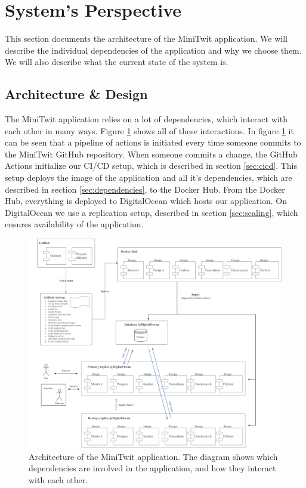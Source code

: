 \section{System's Perspective} \label{sec:system}
This section documents the architecture of the MiniTwit application. We will describe the individual dependencies of the application and why we choose them. We will also describe what the current state of the system is.

\subsection{Architecture \& Design}
The MiniTwit application relies on a lot of dependencies, which interact with each other in many ways. Figure \ref{fig:architecture} shows all of these interactions. In figure \ref{fig:architecture} it can be seen that a pipeline of actions is initiated every time someone commits to the MiniTwit GitHub repository. When someone commits a change, the GitHub Actions initialize our CI/CD setup, which is described in section \ref{sec:cicd}. This setup deploys the image of the application and all it's dependencies, which are described in section \ref{sec:dependencies}, to the Docker Hub. From the Docker Hub, everything is deployed to DigitalOcean which hosts our application. On DigitalOcean we use a replication setup, described in section \ref{sec:scaling}, which ensures availability of the application.

\begin{figure}[H]
    \centering
    \includegraphics[width=\linewidth]{images/architecture.png}
    \caption{Architecture of the MiniTwit application. The diagram shows which dependencies are involved in the application, and how they interact with each other.}
    \label{fig:architecture}
\end{figure}

